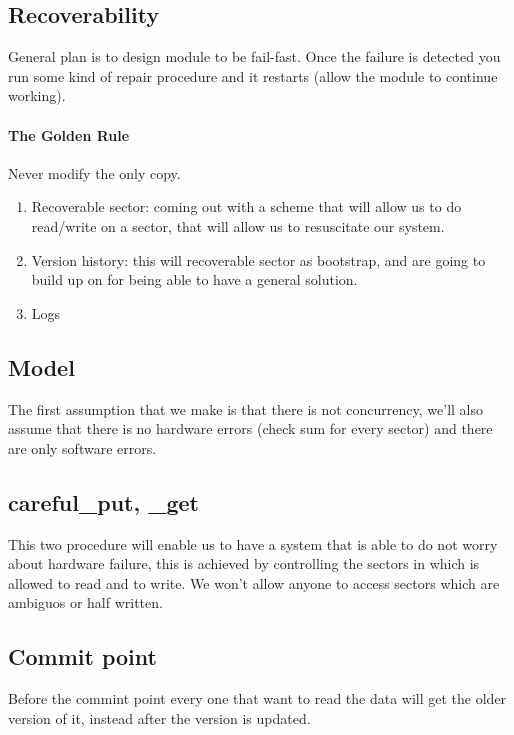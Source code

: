 \documentclass{article}
\begin{document}
    \subsection{Recoverability}
      General plan is to design module to be fail-fast. Once the failure is detected you run
      some kind of repair procedure and it restarts (allow the module to continue working).
      \paragraph{The Golden Rule} Never modify the only copy.
      \begin{enumerate}
        \item Recoverable sector: coming out with a scheme that will allow us to do read/write
          on a sector, that will allow us to resuscitate our system.
        \item Version history: this will recoverable sector as bootstrap, and are going to
          build up on for being able to have a general solution.
        \item Logs
      \end{enumerate}
    \subsection{Model}
      The first assumption that we make is that there is not concurrency, we'll also assume
      that there is no hardware errors (check sum for every sector) and there are only 
      software errors.
      \subsection{careful\_put, \_get} 
        This two procedure will enable us to have a system that is able to do not worry about 
        hardware failure, this is achieved by controlling the sectors in which is allowed 
        to read and to write. We won't allow anyone to access sectors which are ambiguos or
        half written.
      \subsection{Commit point}
        Before the commint point every one that want to read the data will get the older version
        of it, instead after the version is updated.
\end{document}
